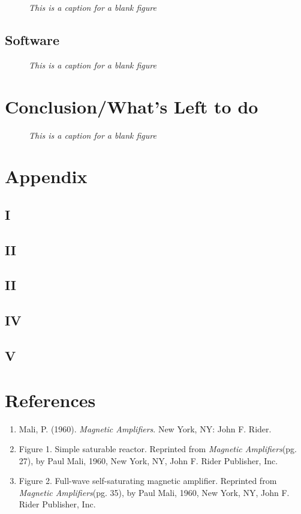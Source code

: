 \documentclass[11pt]{article}
\begin{document}
\blindtext

    \begin{figure}[H]
	\centering	
	\caption{\textit{This is a caption for a blank figure}}	
	\end{figure}

\subsection{Software}

\blindtext

    \begin{figure}[H]
	\centering	
	\caption{\textit{This is a caption for a blank figure}}	
	\end{figure}



\section{Conclusion/What's Left to do}

\blindtext


     \begin{figure}[H]
	\centering	
	\caption{\textit{This is a caption for a blank figure}}	
	\end{figure}

\pagebreak

\section{Appendix}
\subsection{I}
\subsection{II}
\subsection{II}
\subsection{IV}
\subsection{V}	

\pagebreak

\section{References}
\begin{enumerate}
\item Mali, P. (1960).\textit{ Magnetic Amplifiers}. New York, NY: John F. Rider.
\item Figure 1. Simple saturable reactor. Reprinted from \textit{Magnetic Amplifiers}(pg. 27), by Paul Mali, 1960, New York, NY, John F. Rider Publisher, Inc.
\item Figure 2. Full-wave self-saturating magnetic amplifier. Reprinted from \textit{Magnetic Amplifiers}(pg. 35), by Paul Mali, 1960, New York, NY, John F. Rider Publisher, Inc.
\end{enumerate}	
\end{document}

